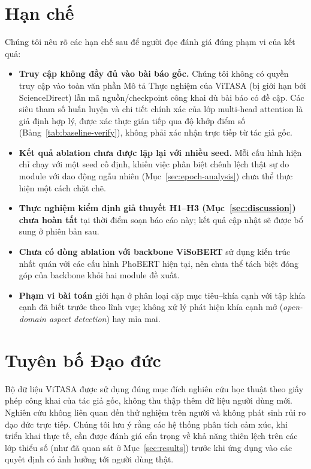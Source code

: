 \documentclass[11pt]{article}
\begin{document}
\section*{Hạn chế}
\label{sec:limitations}

Chúng tôi nêu rõ các hạn chế sau để người đọc đánh giá đúng phạm vi của kết quả:

\begin{itemize}
    \item \textbf{Truy cập không đầy đủ vào bài báo gốc.} Chúng tôi không có quyền truy cập vào toàn văn phần Mô tả Thực nghiệm của ViTASA (bị giới hạn bởi ScienceDirect) lẫn mã nguồn/checkpoint công khai dù bài báo có đề cập. Các siêu tham số huấn luyện và chi tiết chính xác của lớp multi-head attention là giả định hợp lý, được xác thực gián tiếp qua độ khớp điểm số (Bảng~\ref{tab:baseline-verify}), không phải xác nhận trực tiếp từ tác giả gốc.
    \item \textbf{Kết quả ablation chưa được lặp lại với nhiều seed.} Mỗi cấu hình hiện chỉ chạy với một seed cố định, khiến việc phân biệt chênh lệch thật sự do module với dao động ngẫu nhiên (Mục~\ref{sec:epoch-analysis}) chưa thể thực hiện một cách chặt chẽ.
    \item \textbf{Thực nghiệm kiểm định giả thuyết H1--H3 (Mục~\ref{sec:discussion}) chưa hoàn tất} tại thời điểm soạn báo cáo này; kết quả cập nhật sẽ được bổ sung ở phiên bản sau.
    \item \textbf{Chưa có dòng ablation với backbone ViSoBERT} sử dụng kiến trúc nhất quán với các cấu hình PhoBERT hiện tại, nên chưa thể tách biệt đóng góp của backbone khỏi hai module đề xuất.
    \item \textbf{Phạm vi bài toán} giới hạn ở phân loại cặp mục tiêu--khía cạnh với tập khía cạnh đã biết trước theo lĩnh vực; không xử lý phát hiện khía cạnh mở (\textit{open-domain aspect detection}) hay mỉa mai.
\end{itemize}


\section*{Tuyên bố Đạo đức}

Bộ dữ liệu ViTASA được sử dụng đúng mục đích nghiên cứu học thuật theo giấy phép công khai của tác giả gốc, không thu thập thêm dữ liệu người dùng mới. Nghiên cứu không liên quan đến thử nghiệm trên người và không phát sinh rủi ro đạo đức trực tiếp. Chúng tôi lưu ý rằng các hệ thống phân tích cảm xúc, khi triển khai thực tế, cần được đánh giá cẩn trọng về khả năng thiên lệch trên các lớp thiểu số (như đã quan sát ở Mục~\ref{sec:results}) trước khi ứng dụng vào các quyết định có ảnh hưởng tới người dùng thật.


\end{document}
